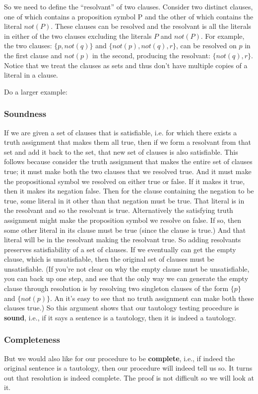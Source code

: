 So we need to define the ``resolvant'' of two clauses.  Consider two
distinct clauses, one of which contains a proposition symbol P and the
other of which contains the literal $not(P)$. These clauses can be
resolved and the resolvant is all the literals in either of the two
clauses excluding the literals $P$ and $not(P)$.  For example, the two
clauses: $\{p,not(q)\}$ and $\{not(p),not(q),r\}$, can be resolved on $p$ in the
first clause and $not(p)$ in the second, producing the resolvant:
$\{not(q),r\}$.  Notice that we treat the clauses as sets and thus don't
have multiple copies of a literal in a clause.

Do a larger example:

\subsubsection{Soundness}
If we are given a set of clauses that is satisfiable, i.e. for which
there exists a truth assignment that makes them all true, then if we
form a resolvant from that set and add it back to the set, that new
set of clauses is also satisfiable.  This follows because consider the
truth assignment that makes the entire set of clauses true; it must
make both the two clauses that we resolved true.  And it must make the
propositional symbol we resolved on either true or false.  If it makes
it true, then it makes its negation false.  Then for the clause
containing the negation to be true, some literal in it other than that
negation must be true.  That literal is in the resolvant and so the
resolvant is true.  Alternatively the satisfying truth assignment
might make the proposition symbol we resolve on false.  If so, then
some other literal in its clause must be true (since the clause is
true.)  And that literal will be in the resolvant making the resolvant
true.  So adding resolvants preserves satisfiability of a set of
clauses.  If we eventually can get the empty clause, which is
unsatisfiable, then the original set of clauses must be
unsatisfiable.  (If you're not clear on why the empty clause must be
unsatisfiable, you can back up one step, and see that the only way we
can generate the empty clause through resolution is by resolving 
two singleton clauses of the form $\{p\}$ and $\{not(p)\}$.  An it's easy to
see that no truth assignment can make both these clauses true.)
So this argument shows that our tautology testing procedure is
{\bf sound}, i.e., if it says a sentence is a tautology, then it is
indeed a tautology.

\subsubsection{Completeness}
But we would also like for our procedure to be {\bf complete}, i.e., if
indeed the original sentence is a tautology, then our procedure will
indeed tell us so.  It turns out that resolution is indeed complete.
The proof is not difficult so we will look at it.

